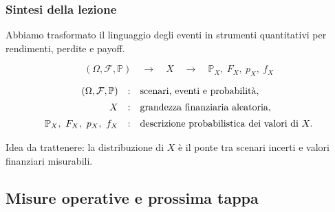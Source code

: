 \documentclass[handout]{beamer}%
\providecommand{\Prob}{\mathbb{P}}
\providecommand{\F}{\mathcal{F}}
\providecommand{\1}{\mathbf{1}}
\providecommand{\QTR}[2]{\csname #1\endcsname{#2}}
\begin{document}
\begin{frame}%
%

\frametitle{Sintesi della lezione}%


Abbiamo trasformato il linguaggio degli eventi in strumenti quantitativi per
rendimenti, perdite e payoff.

\medskip%

\[
(\Omega,\F,\Prob) \quad\longrightarrow\quad X \quad\longrightarrow
\quad\Prob_{X},\ F_{X},\ p_{X},\ f_{X}
\]


\medskip%

\[%
\begin{array}
[c]{rcl}%
(\Omega,\F,\Prob) & : & \mbox{scenari, eventi e probabilit\`{a}},\\[5pt]%
X & : & \mbox{grandezza finanziaria aleatoria},\\[5pt]%
\Prob_{X},\ F_{X},\ p_{X},\ f_{X} & : &
\mbox{descrizione probabilistica dei valori di } X.
\end{array}
\]


\medskip

Idea da trattenere: la distribuzione di $X$ \`{e} il ponte tra scenari incerti
e valori finanziari misurabili.%

\transboxout
\end{frame}%




\subsection{Misure operative e prossima tappa}%
\end{document}
